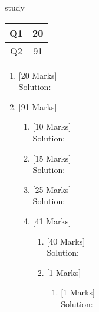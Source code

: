 \documentclass[10pt]{article}
\begin{document}
\vspace*{2cm}
\begin{center}
study
\\\vspace*{1cm}
\begin{tabular}{|c|c|}
\hline Q1 & 20 \\ \hline Q2 & 91 \\ \hline \end{tabular}\end{center}
\begin{enumerate}\item {}\hfill
[20 Marks]
\\Solution:\\ \vspace*{400pt}\item {}\hfill
[91 Marks]
\begin{enumerate}\item {}\hfill
[10 Marks]
\\Solution:\\ \vspace*{200pt}\item {}\hfill
[15 Marks]
\\Solution:\\ \vspace*{300pt}\item {}\hfill
[25 Marks]
\\Solution:\\ \vspace*{500pt}\item {}\hfill
[41 Marks]
\begin{enumerate}\item {}\hfill
[40 Marks]
\\Solution:\\ \vspace*{800pt}\item {}\hfill
[1 Marks]
\begin{enumerate}\item {}\hfill
[1 Marks]
\\Solution:\\ \vspace*{20pt}\end{enumerate}
\end{enumerate}
\end{enumerate}
\end{enumerate}
\end{document}
